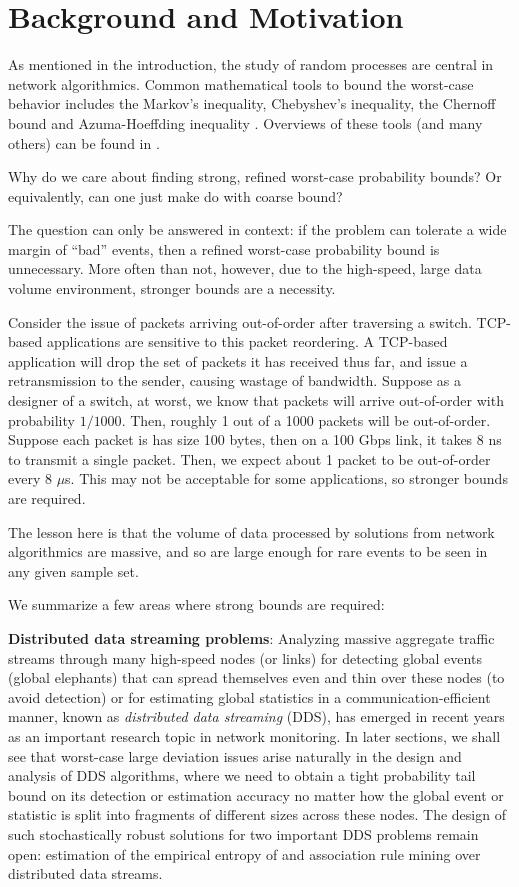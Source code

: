 \section{Background and Motivation}

As mentioned in the introduction, the study of random processes are central in network algorithmics. 
Common mathematical tools to bound the worst-case behavior includes the Markov's inequality,
Chebyshev's inequality, the Chernoff bound and 
Azuma-Hoeffding inequality \cite{Azuma67Martingale,Hoeffding63Bounded}. Overviews of these
tools (and many others) can be found in \cite{Alon04ProbMethod,MitzenmacherProb05,Raghavan95RandAlgo}.

Why do we care about finding strong, refined worst-case probability bounds? Or equivalently, can one just
make do with coarse bound?

The question can only be answered in context: if the problem can tolerate a wide margin of
``bad'' events, then a refined worst-case probability bound is unnecessary. More often than not, however,
due to the high-speed, large data volume environment, stronger bounds are a necessity.

Consider the issue of packets arriving out-of-order after traversing a switch. TCP-based applications
are sensitive to this packet reordering. A TCP-based application will drop the set of packets it has received thus far, and
issue a retransmission to the sender, causing wastage of bandwidth. Suppose as a designer of a switch, at 
worst, we know that packets will arrive out-of-order with probability $1/1000$. Then, roughly 1 out of a 
1000 packets will be out-of-order. Suppose each packet is has size 100 bytes, then on a 100 Gbps link,
it takes 8 ns to transmit a single packet. Then, we expect about 1 packet to be out-of-order every 8 
$\mu$s. This may not be acceptable for some applications, so stronger bounds are required.

The lesson here is that the volume of data processed by solutions from network algorithmics are massive,
and so are large enough for rare events to be seen in any given sample set. 

We summarize a few areas where strong bounds are required:

\medskip
\noindent
\textbf{Distributed data streaming problems}:  Analyzing massive aggregate traffic streams through many high-speed nodes (or links) for 
detecting global events (\eg global elephants) that can spread themselves even and thin over these nodes (to avoid detection) or for estimating 
global statistics in a communication-efficient manner, known as {\it distributed data streaming} (DDS),  has
emerged in recent years as an important research topic in network monitoring.
In later sections, we shall see that worst-case large deviation issues arise naturally in the design and analysis
of DDS algorithms, where we need to obtain a tight
probability tail bound on its detection or estimation accuracy no matter how the global event or statistic is split into
fragments of different sizes across these nodes. The design of such stochastically robust solutions for 
two important DDS problems remain open: estimation of the empirical entropy of and association rule mining over distributed data streams.

